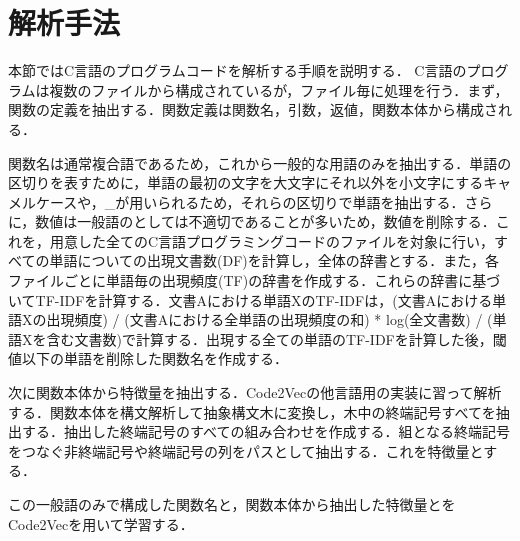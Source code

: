 \documentclass[submit,techrep,noauthor]{ipsj}
\begin{document}
\section{解析手法}

本節ではC言語のプログラムコードを解析する手順を説明する．
C言語のプログラムは複数のファイルから構成されているが，ファイル毎に処理を行う．まず，関数の定義を抽出する．関数定義は関数名，引数，返値，関数本体から構成される．

関数名は通常複合語であるため，これから一般的な用語のみを抽出する．単語の区切りを表すために，単語の最初の文字を大文字にそれ以外を小文字にするキャメルケースや，\_が用いられるため，それらの区切りで単語を抽出する．さらに，数値は一般語のとしては不適切であることが多いため，数値を削除する．これを，用意した全てのC言語プログラミングコードのファイルを対象に行い，すべての単語についての出現文書数(DF)を計算し，全体の辞書とする．また，各ファイルごとに単語毎の出現頻度(TF)の辞書を作成する．これらの辞書に基づいてTF-IDFを計算する．文書Aにおける単語XのTF-IDFは，{(文書Aにおける単語Xの出現頻度) / (文書Aにおける全単語の出現頻度の和)} * log{(全文書数) / (単語Xを含む文書数)}で計算する．出現する全ての単語のTF-IDFを計算した後，閾値以下の単語を削除した関数名を作成する．

次に関数本体から特徴量を抽出する．Code2Vecの他言語用の実装に習って解析する．関数本体を構文解析して抽象構文木に変換し，木中の終端記号すべてを抽出する．抽出した終端記号のすべての組み合わせを作成する．組となる終端記号をつなぐ非終端記号や終端記号の列をパスとして抽出する．これを特徴量とする．

この一般語のみで構成した関数名と，関数本体から抽出した特徴量とをCode2Vecを用いて学習する．






\end{document}
